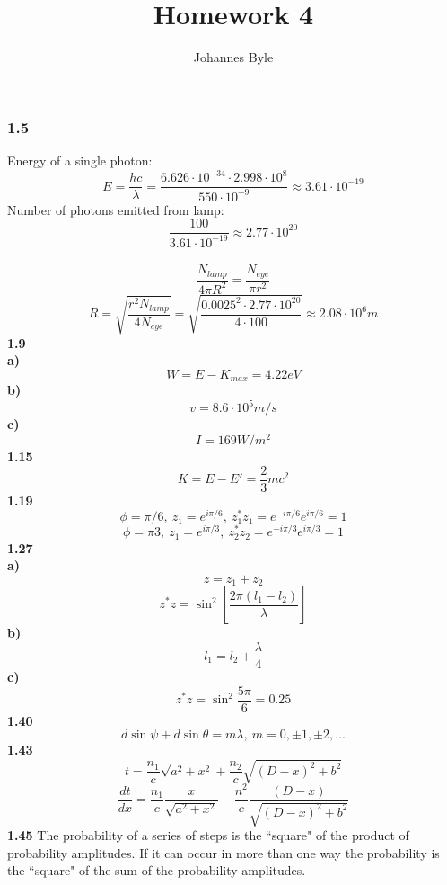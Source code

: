 \documentclass{article}
\title{Homework 4}
\author{Johannes Byle}
\begin{document}
\maketitle
\subsubsection*{1.5}
Energy of a single photon:
$$E=\frac{hc}{\lambda}=\frac{6.626\cdot10^{-34}\cdot2.998\cdot10^{8}}{550\cdot10^{-9}}\approx3.61\cdot10^{-19}$$
Number of photons emitted from lamp:
$$\frac{100}{3.61\cdot10^{-19}}\approx2.77\cdot10^{20}$$\
$$\frac{N_{lamp}}{4\pi R^2}=\frac{N_{eye}}{\pi r^2}$$
$$R=\sqrt{\frac{r^2N_{lamp}}{4N_{eye}}}=\sqrt{\frac{0.0025^2\cdot2.77\cdot10^{20}}{4\cdot100}}\approx2.08\cdot10^6m$$
\textbf{1.9}\\
\textbf{a)}
$$W=E-K_{max}=4.22eV$$
\textbf{b)}
$$v=8.6\cdot10^5m/s$$
\textbf{c)}
$$I=169W/m^2$$
\textbf{1.15}
$$K=E-E'=\frac{2}{3}mc^2$$
\textbf{1.19}
$$\phi=\pi/6,\ z_1=e^{i\pi/6},\ z_1^*z_1=e^{-i\pi/6}e^{i\pi/6}=1$$
$$\phi=\pi3,\ z_1=e^{i\pi/3},\ z_2^*z_2=e^{-i\pi/3}e^{i\pi/3}=1$$
\textbf{1.27}\\
\textbf{a)}
$$z=z_1+z_2$$
$$z^*z=\sin^2\left[\frac{2\pi(l_1-l_2)}{\lambda}\right]$$
\textbf{b)}
$$l_1=l_2+\frac{\lambda}{4}$$
\textbf{c)}
$$z^*z=\sin^2\frac{5\pi}{6}=0.25$$
\textbf{1.40}
$$d\sin\psi+d\sin\theta=m\lambda,\ m=0,\pm1, \pm2,...$$
\textbf{1.43}
$$t=\frac{n_1}{c}\sqrt{a^2+x^2}+\frac{n_2}{c}\sqrt{(D-x)^2+b^2}$$
$$\frac{dt}{dx}=\frac{n_1}{c}\frac{x}{\sqrt{a^2+x^2}}-\frac{n^2}{c}\frac{(D-x)}{\sqrt{(D-x)^2+b^2}}$$
\textbf{1.45}
The probability of a series of steps is the ``square" of the product of probability amplitudes. If it can occur in more than one way the probability is the ``square" of the sum of the probability amplitudes.
\end{document}
